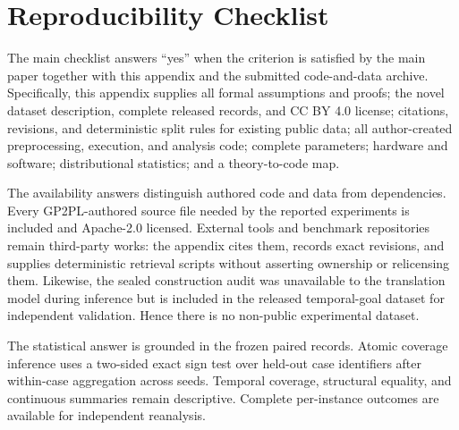 \section{Reproducibility Checklist}
\label{app:checklist-explanation}

The main checklist answers ``yes'' when the criterion is satisfied by the main
paper together with this appendix and the submitted code-and-data archive.
Specifically, this appendix supplies all formal assumptions and proofs; the
novel dataset description, complete released records, and CC BY 4.0 license;
citations, revisions, and deterministic split rules for existing public data;
all author-created preprocessing, execution, and analysis code; complete
parameters; hardware and software; distributional statistics; and a
theory-to-code map.

The availability answers distinguish authored code and data from dependencies.
Every GP2PL-authored source file needed by the reported experiments is included
and Apache-2.0 licensed. External tools and benchmark repositories remain
third-party works: the appendix cites them, records exact revisions, and supplies
deterministic retrieval scripts without asserting ownership or relicensing them.
Likewise, the sealed construction audit was unavailable to the translation model
during inference but is included in the released temporal-goal dataset for
independent validation. Hence there is no non-public experimental dataset.

The statistical answer is grounded in the frozen paired records. Atomic
coverage inference uses a two-sided exact sign test over held-out case
identifiers after within-case aggregation across seeds. Temporal coverage,
structural equality, and continuous summaries remain descriptive. Complete
per-instance outcomes are available for independent reanalysis.
